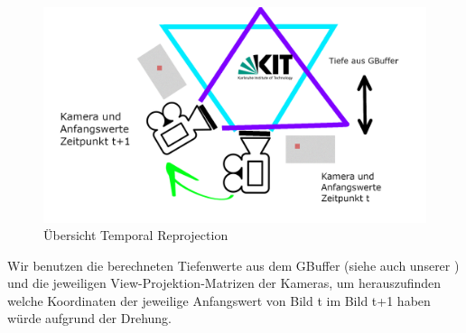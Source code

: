 \begin{figure}[H]
        \centering
        \includegraphics[width=\linewidth]{content/TemporalerAlg/Bilder/Reprojection/TemporalReprojectPrincipal.png}
        \caption{Übersicht Temporal Reprojection}
        \label{pic:Uebersicht_Temporal_Reprojection}
\end{figure}

Wir benutzen die berechneten Tiefenwerte aus dem GBuffer (siehe auch unserer ) und die jeweiligen 
View-Projektion-Matrizen der Kameras, um herauszufinden welche Koordinaten der jeweilige Anfangswert von Bild t im Bild t+1 
haben würde aufgrund der Drehung.
\par 

